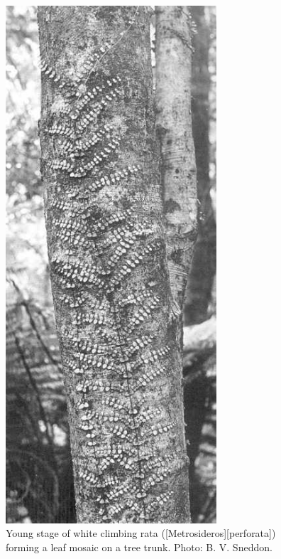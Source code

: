 \begin{figure}[htb]
	\centering
	\begin{minipage}[t]{0.454\textwidth}
		\centering
		\includegraphics[width=0.7\textwidth]{graphics/figure30rata.jpg}
    	\caption[Young stage of white climbing rata]{Young stage of white climbing rata ([Metrosideros][perforata]) forming a leaf mosaic on a tree trunk. Photo: B. V. Sneddon.}%
    	\label{fig:30rata}
	\end{minipage}\hfill%
	\begin{minipage}[t]{0.526\textwidth}

\end{minipage}
\end{figure}

